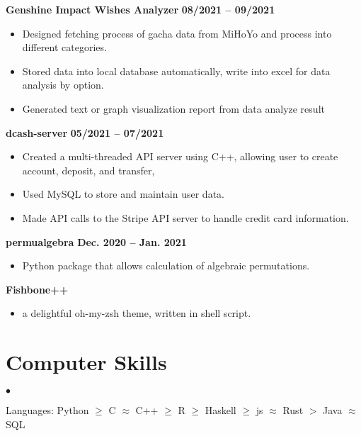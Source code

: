\documentclass[margin,line]{res}
\newenvironment{list2}{
  \begin{list}{$\bullet$}{%
      \setlength{\itemsep}{0in}
      \setlength{\parsep}{0in} \setlength{\parskip}{0in}
      \setlength{\topsep}{0in} \setlength{\partopsep}{0in} 
      \setlength{\leftmargin}{0.2in}}}{\end{list}}
\begin{document}
\begin{resume}
{\bf Genshine Impact Wishes Analyzer} \hfill {\bf 08/2021 -- 09/2021} \\
\begin{itemize}
	\item Designed fetching process of gacha data from MiHoYo and process into different categories.
	\item Stored data into local database automatically, write into excel for data analysis by option.
	\item Generated text or graph visualization report from data analyze result
\end{itemize}
\vspace{-.3cm}

{\bf dcash-server} \hfill {\bf 05/2021 -- 07/2021} \\
\begin{itemize}
	\item Created a multi-threaded API server using C++, allowing user to create account, deposit, and transfer,
	\item Used MySQL to store and maintain user data.
	\item Made API calls to the Stripe API server to handle credit card information.
\end{itemize}
\vspace{-.3cm}


{\bf permualgebra} \hfill {\bf Dec. 2020 -- Jan. 2021} \\
\begin{itemize}
  \item Python package that allows calculation of algebraic permutations.
\end{itemize}
\vspace{-.3cm}

{\bf Fishbone++} \\
\begin{itemize}
  \item a delightful oh-my-zsh theme, written in shell script.
\end{itemize}



\section{\sc Computer Skills} 
\begin{list2}
\item Languages: Python $\geq$ C $\approx$ C++ $\geq$ R $\geq$ Haskell $\geq$ js $\approx$ Rust $>$ Java $\approx$ SQL
\end{list2}



\end{resume}
\end{document}
